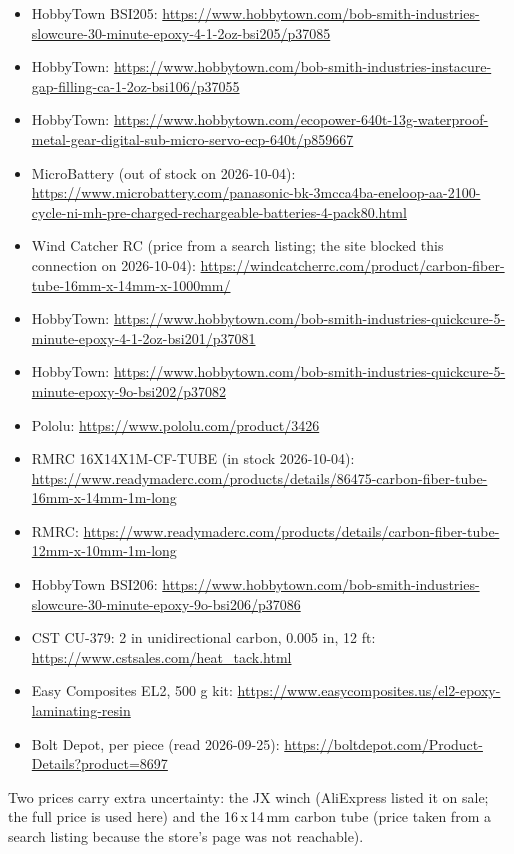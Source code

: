 \documentclass[11pt]{article}
\begin{document}
{\begin{itemize}
\item HobbyTown BSI205: \url{https://www.hobbytown.com/bob-smith-industries-slowcure-30-minute-epoxy-4-1-2oz-bsi205/p37085}
\item HobbyTown: \url{https://www.hobbytown.com/bob-smith-industries-instacure-gap-filling-ca-1-2oz-bsi106/p37055}
\item HobbyTown: \url{https://www.hobbytown.com/ecopower-640t-13g-waterproof-metal-gear-digital-sub-micro-servo-ecp-640t/p859667}
\item MicroBattery (out of stock on 2026-10-04): \url{https://www.microbattery.com/panasonic-bk-3mcca4ba-eneloop-aa-2100-cycle-ni-mh-pre-charged-rechargeable-batteries-4-pack80.html}
\item Wind Catcher RC (price from a search listing; the site blocked this connection on 2026-10-04): \url{https://windcatcherrc.com/product/carbon-fiber-tube-16mm-x-14mm-x-1000mm/}
\item HobbyTown: \url{https://www.hobbytown.com/bob-smith-industries-quickcure-5-minute-epoxy-4-1-2oz-bsi201/p37081}
\item HobbyTown: \url{https://www.hobbytown.com/bob-smith-industries-quickcure-5-minute-epoxy-9o-bsi202/p37082}
\item Pololu: \url{https://www.pololu.com/product/3426}
\item RMRC 16X14X1M-CF-TUBE (in stock 2026-10-04): \url{https://www.readymaderc.com/products/details/86475-carbon-fiber-tube-16mm-x-14mm-1m-long}
\item RMRC: \url{https://www.readymaderc.com/products/details/carbon-fiber-tube-12mm-x-10mm-1m-long}
\item HobbyTown BSI206: \url{https://www.hobbytown.com/bob-smith-industries-slowcure-30-minute-epoxy-9o-bsi206/p37086}
\item CST CU-379: 2 in unidirectional carbon, 0.005 in, 12 ft: \url{https://www.cstsales.com/heat_tack.html}
\item Easy Composites EL2, 500 g kit: \url{https://www.easycomposites.us/el2-epoxy-laminating-resin}
\item Bolt Depot, per piece (read 2026-09-25): \url{https://boltdepot.com/Product-Details?product=8697}
\end{itemize}}
Two prices carry extra uncertainty: the JX winch (AliExpress listed it on sale; the full price is used here) and the 16\,x\,14\,mm carbon tube (price taken from a search listing because the store's page was not reachable).
\end{document}
